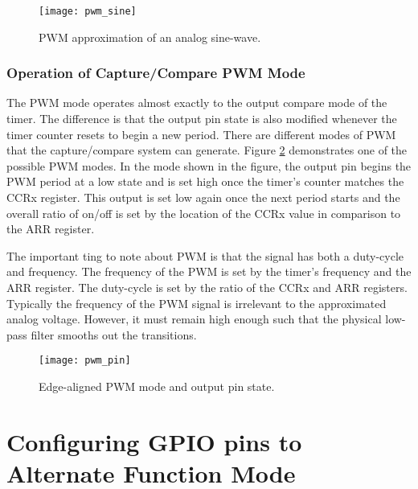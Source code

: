 \documentclass[11pt,fleqn]{book} %
\begin{document}
%        
    \begin{figure}[]
        \centering\texttt{[image: pwm\_sine]}
        \caption{PWM approximation of an analog sine-wave.}
        \label{pwm_sine}
    \end{figure}
    
    \subsubsection{Operation of Capture/Compare PWM Mode}
    The PWM mode operates almost exactly to the output compare mode of the timer. The difference is that the output pin state is also modified whenever the timer counter resets to begin a new period. There are different modes of PWM that the capture/compare system can generate. Figure \ref{pwm_pin} demonstrates one of the possible PWM modes. In the mode shown in the figure, the output pin begins the PWM period at a low state and is set high once the timer's counter matches the CCRx register. This output is set low again once the next period starts and the overall ratio of on/off is set by the location of the CCRx value in comparison to the ARR register. 
   
   The important ting to note about PWM is that the signal has both a duty-cycle and frequency. The frequency of the PWM is set by the timer's frequency and the ARR register. The duty-cycle is set by the ratio of the CCRx and ARR registers. Typically the frequency of the PWM signal is irrelevant to the approximated analog voltage. However, it must remain high enough such that the physical low-pass filter smooths out the transitions. 
   
    
    
     \begin{figure}[]
        \centering\texttt{[image: pwm\_pin]}
        \caption{Edge-aligned PWM mode and output pin state.}
        \label{pwm_pin}
    \end{figure}

\section{Configuring GPIO pins to Alternate Function Mode} \label{alternate_mode}
\end{document}
